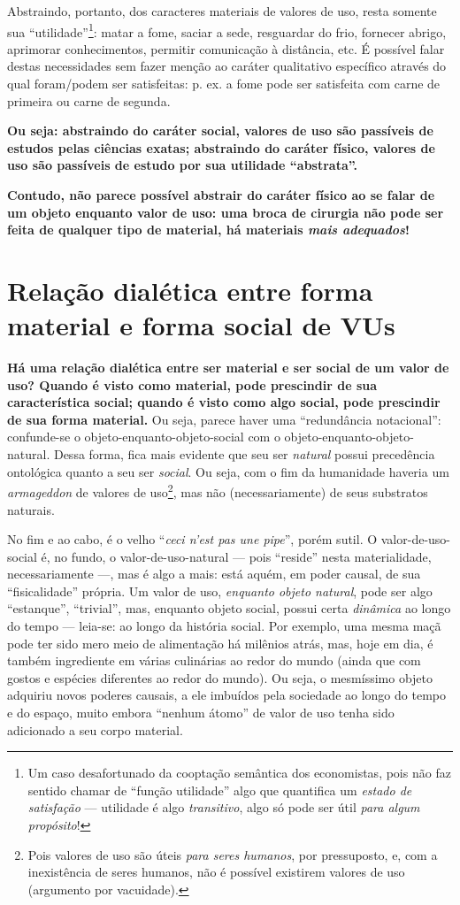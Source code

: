 \documentclass[12pt]{article}
\begin{document}
Abstraindo, portanto, dos caracteres materiais de valores de uso, resta somente sua ``utilidade''\footnote{Um caso desafortunado da cooptação  semântica dos economistas, pois não faz sentido chamar de ``função utilidade'' algo que quantifica um \textit{estado de satisfação} --- utilidade é algo \textit{transitivo}, algo só pode ser útil \textit{para algum propósito}!}: matar a fome, saciar a sede, resguardar do frio, fornecer abrigo, aprimorar conhecimentos, permitir comunicação à distância, etc. É possível falar destas necessidades sem fazer menção ao caráter qualitativo específico através do qual foram/podem ser satisfeitas: p. ex. a fome pode ser satisfeita com carne de primeira ou carne de segunda.

\textbf{Ou seja: abstraindo do caráter social, valores de uso são passíveis de estudos pelas ciências exatas; abstraindo do caráter físico, valores de uso são passíveis de estudo por sua utilidade ``abstrata''.}

\textbf{Contudo, não parece possível abstrair do caráter físico ao se falar de um objeto enquanto valor de uso: uma broca de cirurgia não pode ser feita de qualquer tipo de material, há materiais \textit{mais adequados}!}




\section{Relação dialética entre forma material e forma social de VUs}
\textbf{Há uma relação dialética entre ser material e ser social de um valor de uso? Quando é visto como material, pode prescindir de sua característica social; quando é visto como algo social, pode prescindir de sua forma material.}
Ou seja, parece haver uma ``redundância notacional'': confunde-se o objeto-enquanto-objeto-social com o objeto-enquanto-objeto-natural. Dessa forma, fica mais evidente que seu ser \textit{natural} possui precedência ontológica quanto a seu ser \textit{social}. Ou seja, com o fim da humanidade haveria um \textit{armageddon} de valores de uso\footnote{Pois valores de uso são úteis \textit{para seres humanos}, por pressuposto, e, com a inexistência de seres humanos, não é possível existirem valores de uso (argumento por vacuidade).}, mas não (necessariamente) de seus substratos naturais.

No fim e ao cabo, é o velho ``\textit{ceci n'est pas une pipe}'', porém sutil. O valor-de-uso-social é, no fundo, o valor-de-uso-natural --- pois ``reside'' nesta materialidade, necessariamente ---, mas é algo a mais: está aquém, em poder causal, de sua ``fisicalidade'' própria. Um valor de uso, \textit{enquanto objeto natural}, pode ser algo ``estanque'', ``trivial'', mas, enquanto objeto social, possui certa \textit{dinâmica} ao longo do tempo --- leia-se: ao longo da história social. Por exemplo, uma mesma maçã pode ter sido mero meio de alimentação há milênios atrás, mas, hoje em dia, é também ingrediente em várias culinárias ao redor do mundo (ainda que com gostos e espécies diferentes ao redor do mundo). Ou seja, o mesmíssimo objeto adquiriu novos poderes causais, a ele imbuídos pela sociedade ao longo do tempo e do espaço, muito embora ``nenhum átomo'' de valor de uso tenha sido adicionado a seu corpo material.
\end{document}
